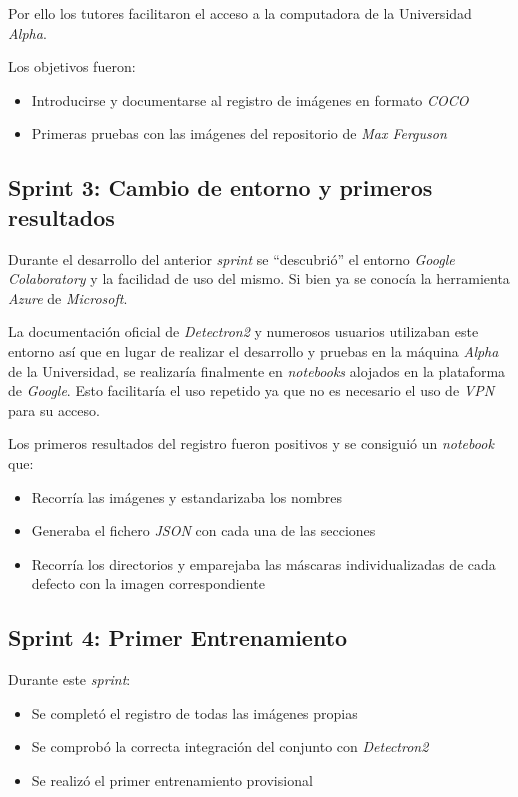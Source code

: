 Por ello los tutores facilitaron el acceso a la computadora de la Universidad \emph{Alpha}.

Los objetivos fueron:

\begin{itemize}
    \item Introducirse y documentarse al registro de imágenes en formato \emph{COCO}
    \item Primeras pruebas con las imágenes del repositorio de \emph{Max Ferguson} \cite{repositorio:ferguson}
\end{itemize}

\subsection{Sprint 3: Cambio de entorno y primeros resultados}
Durante el desarrollo del anterior \emph{sprint} se ``descubrió'' el entorno \emph{Google Colaboratory} y la facilidad de uso del mismo. Si bien ya se conocía la herramienta \emph{Azure} de \emph{Microsoft}. 

La documentación oficial de \emph{Detectron2} y numerosos usuarios utilizaban este entorno así que en lugar de realizar el desarrollo y pruebas en la máquina \emph{Alpha} de la Universidad, se realizaría finalmente en \emph{notebooks} alojados en la plataforma de \emph{Google}. Esto facilitaría el uso repetido ya que no es necesario el uso de \emph{VPN} para su acceso.

Los primeros resultados del registro fueron positivos y se consiguió un \emph{notebook} que:

\begin{itemize}
    \item Recorría las imágenes y estandarizaba los nombres
    \item Generaba el fichero \emph{JSON} con cada una de las secciones
    \item Recorría los directorios y emparejaba las máscaras individualizadas de cada defecto con la imagen correspondiente
\end{itemize}

\subsection{Sprint 4: Primer Entrenamiento}
Durante este \emph{sprint}:

\begin{itemize}
    \item Se completó el registro de todas las imágenes propias
    \item Se comprobó la correcta integración del conjunto con \emph{Detectron2}
    \item Se realizó el primer entrenamiento provisional
\end{itemize}

